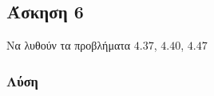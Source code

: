 \newpage \subsection*{Άσκηση 6}

Να λυθούν τα προβλήματα $4.37$, $4.40$, $4.47$ 

\subsubsection*{Λύση}

    \inputminted{verilog}{./ex6/437.v}
    \inputminted{verilog}{./ex6/447.v}
